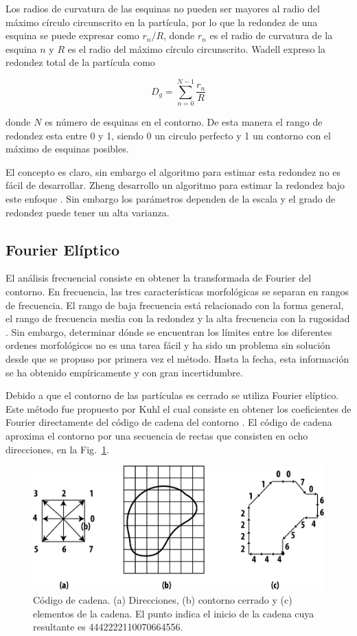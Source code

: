 \documentclass[conference]{IEEEtran}
\begin{document}
Los radios de curvatura de las esquinas no pueden ser mayores al radio del máximo círculo circunscrito en la partícula, por lo que la redondez de una esquina se puede expresar como $r_{n}/R$, donde $r_{n}$ es el radio de curvatura de la esquina $n$ y $R$ es el radio del máximo círculo circunscrito. Wadell  \cite{b7} expreso la redondez total de la partícula como  

\begin{equation}
D_{g} = \sum_{n=0}^{N-1}{ \frac{r_{n}}{R}} \label{eq1}
\end{equation}

donde $N$ es número de esquinas en el contorno. De esta manera el rango de redondez esta entre 0 y 1, siendo 0 un circulo perfecto y 1 un contorno con el máximo de esquinas posibles. 

El concepto es claro, sin embargo el algoritmo para estimar esta redondez no es fácil de desarrollar.  Zheng desarrollo un algoritmo para estimar la redondez bajo este enfoque \cite{b7}. Sin embargo los parámetros dependen de la escala y el grado de redondez puede tener un alta varianza. 


\subsection{Fourier Elíptico}
El análisis frecuencial consiste en obtener la transformada de Fourier del contorno. En frecuencia, las tres características morfológicas se separan en rangos de frecuencia. El rango de baja frecuencia está relacionado con la forma general, el rango de frecuencia media con la redondez y la alta frecuencia con la rugosidad \cite{b9}. Sin embargo, determinar dónde se encuentran los límites entre los diferentes ordenes morfológicos no es una tarea fácil y ha sido un problema sin solución desde que se propuso por primera vez el método. Hasta la fecha, esta información se ha obtenido empíricamente y con gran incertidumbre.

Debido a que el contorno de las partículas es cerrado se utiliza Fourier elíptico. Este método fue propuesto por Kuhl el cual consiste en obtener los coeficientes de Fourier directamente del código de cadena del contorno \cite{b10}. El código de cadena aproxima el contorno por una secuencia de rectas que consisten en ocho direcciones, en la Fig.~\ref{fig3}.

\begin{figure}[htbp]
\centerline{\includegraphics[scale=0.6]{fig3.png}}
\caption{Código de cadena. (a) Direcciones, (b) contorno cerrado y (c) elementos de la cadena. El punto indica el inicio de la cadena cuya resultante es 4442222110070664556.}
\label{fig3}
\end{figure}
\end{document}
